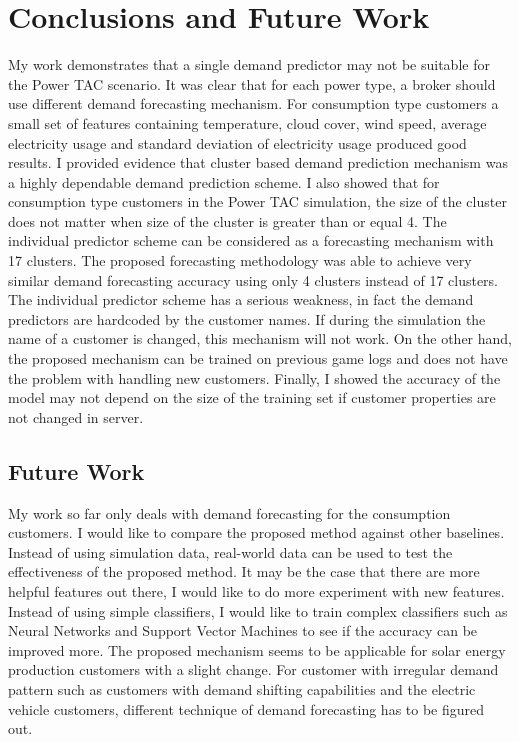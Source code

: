 
\chapter{Conclusions and Future Work}

My work demonstrates that a single demand predictor may not be suitable for the Power TAC scenario. It was clear that for each power type, a broker should use different demand forecasting mechanism. For consumption type customers a small set of features containing temperature, cloud cover, wind speed, average electricity usage and standard deviation of electricity usage produced good results. I provided evidence that cluster based demand prediction mechanism was a highly dependable demand prediction scheme. I also showed that for consumption type customers in the Power TAC simulation, the size of the cluster does not matter when size of the cluster is greater than or equal 4. The individual predictor scheme can be considered as a forecasting mechanism with 17 clusters. The proposed forecasting methodology was able to achieve very similar demand forecasting accuracy using only 4 clusters instead of 17 clusters. The individual predictor scheme has a serious weakness, in fact the demand predictors are hardcoded by the customer names. If during the simulation the name of a customer is changed, this mechanism will not work. On the other hand, the proposed mechanism can be trained on previous game logs and does not have the problem with handling new customers. Finally, I showed the accuracy of the model may not depend on the size of the training set if customer properties are not changed in server.

\section{Future Work}

My work so far only deals with demand forecasting for the consumption customers. I would like to compare the proposed method against other baselines. Instead of using simulation data, real-world data can be used to test the effectiveness of the proposed method. It may be the case that there are more helpful features out there, I would like to do more experiment with new features. Instead of using simple classifiers, I would like to train complex classifiers such as Neural Networks \cite{witten2005data} and Support Vector Machines \cite{witten2005data} to see if the accuracy can be improved more.  The proposed mechanism seems to be applicable for solar energy production customers with a slight change. For customer with irregular demand pattern such as customers with demand shifting capabilities and the electric vehicle customers, different technique of demand forecasting has to be figured out. 
